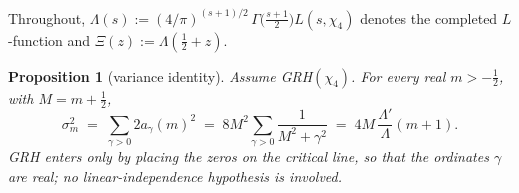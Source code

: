 \documentclass[11pt]{article}
\newtheorem{proposition}{Proposition}
\begin{document}
Throughout, $\Lambda(s):=(4/\pi)^{(s+1)/2}\,\Gamma\!\bigl(\tfrac{s+1}2\bigr)
L(s,\chi_4)$ denotes the completed $L$-function and
$\Xi(z):=\Lambda(\tfrac12+z)$.

\begin{proposition}[variance identity]\label{prop:varid}
Assume GRH$(\chi_4)$. For every real $m>-\tfrac12$, with $M=m+\tfrac12$,
\begin{equation}\label{eq:varid}
\sigma_m^2\;=\;\sum_{\gamma>0}2a_\gamma(m)^2
\;=\;8M^2\sum_{\gamma>0}\frac{1}{M^2+\gamma^2}
\;=\;4M\,\frac{\Lambda'}{\Lambda}(m+1).
\end{equation}
GRH enters only by placing the zeros on the critical line, so that the
ordinates $\gamma$ are real; no linear-independence hypothesis is
involved.
\end{proposition}
\end{document}
